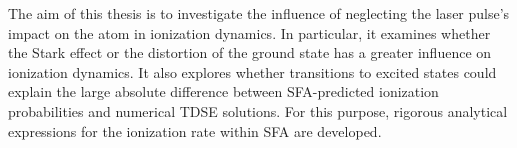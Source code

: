 \medskip
The aim of this thesis is to investigate the influence of neglecting the laser pulse's impact on the atom in ionization dynamics.
In particular, it examines whether the Stark effect or the distortion of the ground state has a greater influence on ionization dynamics.
It also explores whether transitions to excited states could explain the large absolute difference between SFA-predicted ionization probabilities and numerical TDSE solutions.
For this purpose, rigorous analytical expressions for the ionization rate within SFA are developed.







